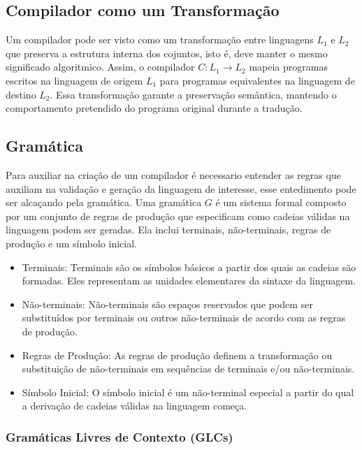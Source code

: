 \documentclass[english, 
               brazil, 
               bsc] %
               {dcomp-abntex2}
\begin{document}
\subsection{Compilador como um Transformação}

Um compilador pode ser visto como um transformação entre linguagens $ L_1 $ e $ L_2 $ que preserva a estrutura interna dos cojuntos, isto é, deve manter o mesmo significado algoritmico. Assim, o compilador $ C: L_1 \rightarrow L_2 $ mapeia programas escritos na linguagem de origem $ L_1 $ para programas equivalentes na linguagem de destino $ L_2 $. Essa transformação garante a preservação semântica, mantendo o comportamento pretendido do programa original durante a tradução.


\subsection{Gramática} \label{gramatica}

Para auxiliar na criação de um compilador é necessario entender as regras que auxiliam na validação e geração da linguagem de interesse, esse entedimento pode ser alcaçando pela gramática. Uma gramática $ G $ é um sistema formal composto por um conjunto de regras de produção que especificam como cadeias válidas na linguagem podem ser geradas. Ela inclui terminais, não-terminais, regras de produção e um símbolo inicial.

\begin{itemize}
  \item Terminais: Terminais são os símbolos básicos a partir dos quais as cadeias são formadas. Eles representam as unidades elementares da sintaxe da linguagem.
  \item Não-terminais: Não-terminais são espaços reservados que podem ser substituídos por terminais ou outros não-terminais de acordo com as regras de produção.

  \item Regras de Produção: As regras de produção definem a transformação ou substituição de não-terminais em sequências de terminais e/ou não-terminais.

  \item Símbolo Inicial: O símbolo inicial é um não-terminal especial a partir do qual a derivação de cadeias válidas na linguagem começa.
\end{itemize}


\subsubsection{Gramáticas Livres de Contexto (GLCs)}
\end{document}
